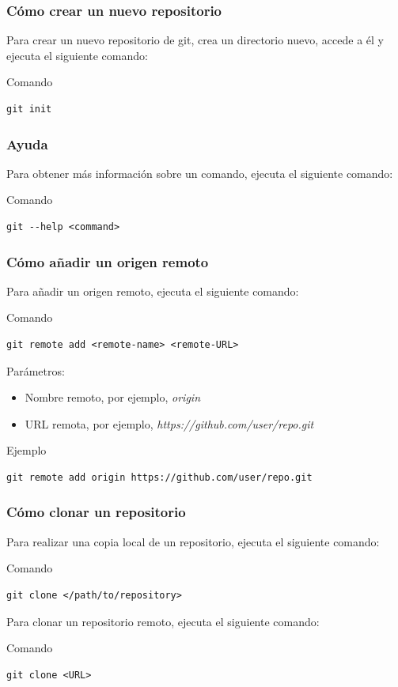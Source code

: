 \documentclass{beamer}
\begin{document}
\begin{frame}[fragile]
\frametitle{Cómo crear un nuevo repositorio}
Para crear un nuevo repositorio de git, crea un directorio nuevo, accede a él y ejecuta el siguiente comando:
\begin{block}{Comando}
\begin{verbatim}
git init
\end{verbatim}
\end{block}
\end{frame}

\begin{frame}[fragile]
\frametitle{Ayuda}
Para obtener más información sobre un comando, ejecuta el siguiente comando:
\begin{block}{Comando}
\begin{verbatim}
git --help <command>
\end{verbatim}
\end{block}
\end{frame}

\begin{frame}[fragile]
\frametitle{Cómo añadir un origen remoto}
Para añadir un origen remoto, ejecuta el siguiente comando:
\begin{block}{Comando}
\begin{verbatim}
git remote add <remote-name> <remote-URL>
\end{verbatim}
\end{block}
\vskip 1.0cm
Parámetros:
\begin{itemize}
\item Nombre remoto, por ejemplo, \textit{origin}
\item URL remota, por ejemplo, \textit{https://github.com/user/repo.git}
\end{itemize}
\begin{block}{Ejemplo}
\begin{verbatim}
git remote add origin https://github.com/user/repo.git
\end{verbatim}
\end{block}
\end{frame}

\begin{frame}[fragile]
\frametitle{Cómo clonar un repositorio}
Para realizar una copia local de un repositorio, ejecuta el siguiente comando:
\begin{block}{Comando}
\begin{verbatim}
git clone </path/to/repository>
\end{verbatim}
\end{block}
\vskip 1.0cm
Para clonar un repositorio remoto, ejecuta el siguiente comando:
\begin{block}{Comando}
\begin{verbatim}
git clone <URL>
\end{verbatim}
\end{block}
\end{frame}
\end{document}
